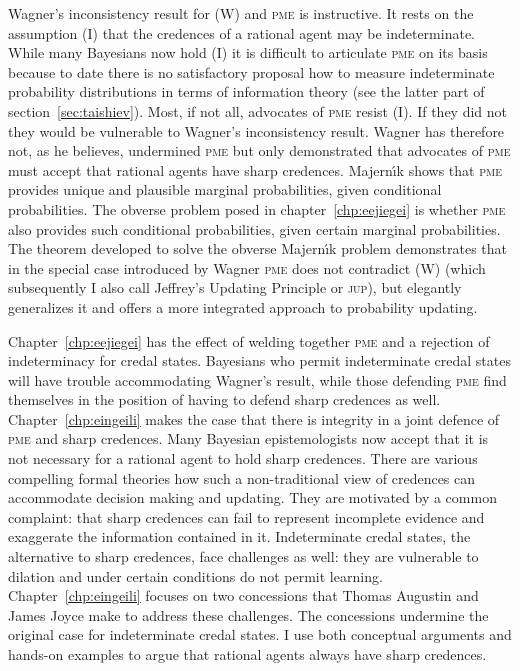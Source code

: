 \documentclass[phd,12pt,oneside]{ubcthesis}
\begin{document}
Wagner's inconsistency result for (W) and \textsc{pme} is instructive.
It rests on the assumption (I) that the credences of a rational agent
may be indeterminate. While many Bayesians now hold (I) it is
difficult to articulate \textsc{pme} on its basis because to date
there is no satisfactory proposal how to measure indeterminate
probability distributions in terms of information theory (see the
latter part of section~\ref{sec:taishiev}). Most, if not all,
advocates of \textsc{pme} resist (I). If they did not they would be
vulnerable to Wagner's inconsistency result. Wagner has therefore not,
as he believes, undermined \textsc{pme} but only demonstrated that
advocates of \textsc{pme} must accept that rational agents have sharp
credences. Majern{\'\i}k shows that \textsc{pme} provides unique and
plausible marginal probabilities, given conditional probabilities. The
obverse problem posed in chapter~\ref{chp:eejiegei} is whether
\textsc{pme} also provides such conditional probabilities, given
certain marginal probabilities. The theorem developed to solve the
obverse Majern{\'\i}k problem demonstrates that in the special case
introduced by Wagner \textsc{pme} does not contradict (W) (which
subsequently I also call Jeffrey's Updating Principle or
\textsc{jup}), but elegantly generalizes it and offers a more
integrated approach to probability updating.

Chapter~\ref{chp:eejiegei} has the effect of welding together
\textsc{pme} and a rejection of indeterminacy for credal states.
Bayesians who permit indeterminate credal states will have trouble
accommodating Wagner's result, while those defending \textsc{pme} find
themselves in the position of having to defend sharp credences as
well. Chapter~\ref{chp:eingeili} makes the case that there is
integrity in a joint defence of \textsc{pme} and sharp credences. Many
Bayesian epistemologists now accept that it is not necessary for a
rational agent to hold sharp credences. There are various compelling
formal theories how such a non-traditional view of credences can
accommodate decision making and updating. They are motivated by a
common complaint: that sharp credences can fail to represent
incomplete evidence and exaggerate the information contained in it.
Indeterminate credal states, the alternative to sharp credences, face
challenges as well: they are vulnerable to dilation and under certain
conditions do not permit learning. Chapter~\ref{chp:eingeili} focuses
on two concessions that Thomas Augustin and James Joyce make to
address these challenges. The concessions undermine the original case
for indeterminate credal states. I use both conceptual arguments and
hands-on examples to argue that rational agents always have sharp
credences.
\end{document}
